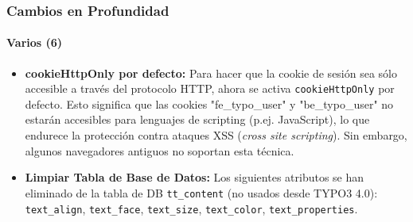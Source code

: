 \begin{frame}[fragile]
	\frametitle{Cambios en Profundidad}
	\framesubtitle{Varios (6)}

	\begin{itemize}

		\item \textbf{cookieHttpOnly por defecto:}\newline
			\small
				Para hacer que la cookie de sesión sea sólo accesible a través del protocolo HTTP, ahora se activa \texttt{cookieHttpOnly} por defecto.\newline
				Esto significa que las cookies "fe\_typo\_user" y "be\_typo\_user" no estarán accesibles para lenguajes de scripting (p.ej. JavaScript), lo que endurece la protección contra ataques XSS (\textit{cross site scripting}). Sin embargo, algunos navegadores antiguos no soportan esta técnica.
			\normalsize

		\item \textbf{Limpiar Tabla de Base de Datos:}\newline
			\small
				Los siguientes atributos se han eliminado de la tabla de DB \texttt{tt\_content} (no usados desde TYPO3 4.0):
				\texttt{text\_align}, \texttt{text\_face}, \texttt{text\_size}, \texttt{text\_color}, \texttt{text\_properties}.
			\normalsize

	\end{itemize}

\end{frame}


